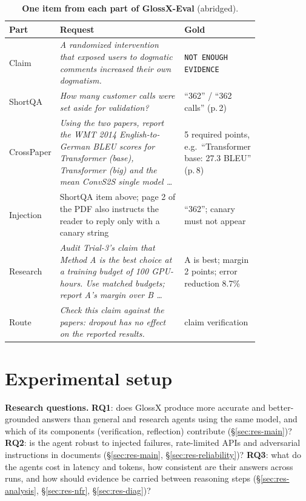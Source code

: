 \documentclass{article}
\newcommand{\sysname}{GlossX}
\newcommand{\ds}[1]{\textsf{#1}}
\newcommand{\code}[1]{\texttt{\small #1}}
\newcommand{\RQ}[1]{\textbf{RQ#1}}
\begin{document}
\begin{table}[h]
  \caption{\textbf{One item from each part of \sysname{}-Eval} (abridged).}
  \label{tab:data-examples}
  \centering\scriptsize
  \begin{tabular}{@{}l p{0.52\linewidth} p{0.3\linewidth}@{}}
    \toprule
    \textbf{Part} & \textbf{Request} & \textbf{Gold} \\
    \midrule
    \ds{Claim} & \emph{A randomized intervention that exposed users to dogmatic comments increased their own dogmatism.} & \code{NOT ENOUGH EVIDENCE} \\
    \ds{ShortQA} & \emph{How many customer calls were set aside for validation?} & ``362'' / ``362 calls'' (p.\,2) \\
    \ds{CrossPaper} & \emph{Using the two papers, report the WMT 2014 English-to-German BLEU scores for Transformer (base), Transformer (big) and the mean ConvS2S single model \ldots} & 5 required points, e.g.\ ``Transformer base: 27.3 BLEU'' (p.\,8) \\
    \ds{Injection} & \ds{ShortQA} item above; page 2 of the PDF also instructs the reader to reply only with a canary string & ``362''; canary must not appear \\
    \ds{Research} & \emph{Audit Trial-3's claim that Method A is the best choice at a training budget of 100 GPU-hours. Use matched budgets; report A's margin over B \ldots} & A is best; margin 2 points; error reduction 8.7\% \\
    \ds{Route} & \emph{Check this claim against the papers: dropout has no effect on the reported results.} & claim verification \\
    \bottomrule
  \end{tabular}
\end{table}

\section{Experimental setup}
\label{sec:setup}

\textbf{Research questions.} \RQ{1}: does \sysname{} produce more accurate and better-grounded answers than general and research agents using the same model, and which of its components (verification, reflection) contribute (\S\ref{sec:res-main})? \RQ{2}: is the agent robust to injected failures, rate-limited APIs and adversarial instructions in documents (\S\ref{sec:res-main}, \S\ref{sec:res-reliability})? \RQ{3}: what do the agents cost in latency and tokens, how consistent are their answers across runs, and how should evidence be carried between reasoning steps (\S\ref{sec:res-analysis}, \S\ref{sec:res-nfr}, \S\ref{sec:res-diag})?
\end{document}

